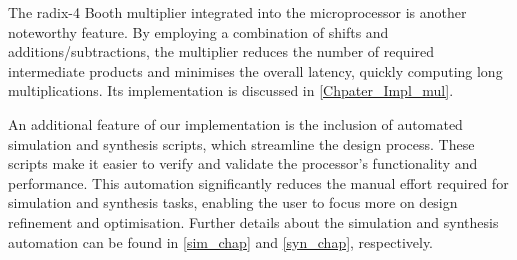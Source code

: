 The radix-4 Booth multiplier integrated into the microprocessor is another noteworthy feature. 
By employing a combination of shifts and additions/subtractions, the multiplier reduces the number of required intermediate products and minimises the overall latency, quickly computing long multiplications. 
Its implementation is discussed in  \autoref{Chpater_Impl_mul}. 

An additional feature of our implementation is the inclusion of automated simulation and synthesis scripts, which streamline the design process. 
These scripts make it easier to verify and validate the processor's functionality and performance. 
This automation significantly reduces the manual effort required for simulation and synthesis tasks, enabling  the user to focus more on design refinement and optimisation. 
Further details about the simulation and synthesis automation can be found in \autoref{sim_chap} and \autoref{syn_chap}, respectively.
